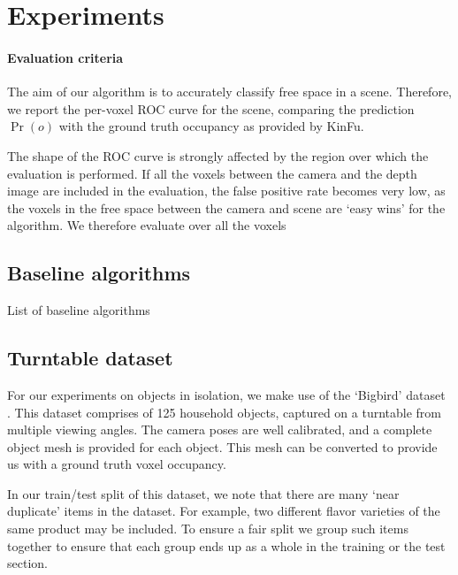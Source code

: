 \documentclass[10pt,twocolumn,letterpaper]{article}
\begin{document}
\section{Experiments}

\paragraph{Evaluation criteria}
The aim of our algorithm is to accurately classify free space in a scene.
Therefore, we report the per-voxel ROC curve for the scene, comparing the prediction $\Pr(o)$ with the ground truth occupancy as provided by KinFu.

The shape of the ROC curve is strongly affected by the region over which the evaluation is performed.
If all the voxels between the camera and the depth image are included in the evaluation, the false positive rate becomes very low, as the voxels in the free space between the camera and scene are `easy wins' for the algorithm. We therefore evaluate over all the voxels 

\subsection{Baseline algorithms}

List of baseline algorithms

\subsection{Turntable dataset}

For our experiments on objects in isolation, we make use of the `Bigbird' dataset \cite{singh-icra-2014}. 
This dataset comprises of 125 household objects, captured on a turntable from multiple viewing angles.
The camera poses are well calibrated, and a complete object mesh is provided for each object.
This mesh can be converted to provide us with a ground truth voxel occupancy.

In our train/test split of this dataset, we note that there are many `near duplicate' items in the dataset.
For example, two different flavor varieties of the same product may be included.
To ensure a fair split we group such items together to ensure that each group ends up as a whole in the training or the test section.


\end{document}
